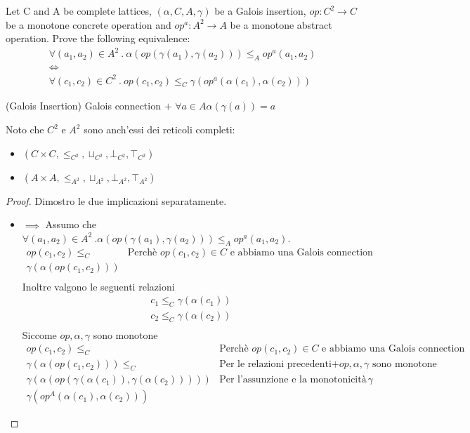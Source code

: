 {Let C and A be complete lattices, $(\alpha, C, A, \gamma)$ be a Galois insertion, $op : C^2 \to C$ be a monotone concrete operation and $op^a : A^2 \to A$ be a monotone abstract operation. Prove the following equivalence:
$$
\begin{array}{c}
	\forall (a_1, a_2) \in A^2\ .\ \alpha(op(\gamma(a_1), \gamma(a_2))) \leq_A op^a(a_1,a_2) \\
	\iff \\
	\forall (c_1, c_2) \in C^2\ .\ op(c_1, c_2) \leq_C \gamma(op^a(\alpha(c_1), \alpha(c_2)))
\end{array}
$$
}
{
\begin{mydef}(Galois Insertion)
Galois connection $+$ $\forall a \in A \alpha(\gamma(a)) = a$
\end{mydef}

Noto che $C^2$ e $A^2$ sono anch'essi dei reticoli completi:
\begin{itemize}
	\item $(C \times C, \leq_{C^2}, \sqcup_{C^2}, \bot_{C^2}, \top_{C^2})$
	\item $(A \times A, \leq_{A^2}, \sqcup_{A^2}, \bot_{A^2}, \top_{A^2})$
\end{itemize}
\begin{proof}
	Dimostro le due implicazioni separatamente.
\begin{itemize}
\item
$\boxed{\implies}$ 
Assumo che $\forall (a_1, a_2) \in A^2\ .  \alpha(op(\gamma(a_1), \gamma(a_2))) \leq_A op^a(a_1,a_2)$.
$$
\begin{array}{lr}
	op(c_1, c_2) \leq_C & \text{Perchè $op(c_1, c_2) \in C$ e abbiamo una Galois connection}\\
	\gamma(\alpha(op(c_1, c_2))) & \\
\end{array}
$$	
Inoltre valgono le seguenti relazioni
$$
\begin{array}{l}
c_1 \leq_C \gamma(\alpha(c_1))\\
c_2 \leq_C \gamma(\alpha(c_2))\\
\end{array}
$$
Siccome $op, \alpha, \gamma$ sono monotone
$$
\begin{array}{lr}
op(c_1, c_2) \leq_C & \text{Perchè $op(c_1, c_2) \in C$ e abbiamo una Galois connection}\\
\gamma(\alpha(op(c_1, c_2))) \leq_C & \text{Per le relazioni precedenti+$op, \alpha, \gamma$ sono monotone}\\
\gamma(\alpha(op(\gamma(\alpha(c_1)), \gamma(\alpha(c_2) )))) & \text{Per l'assunzione e la monotonicità di $\gamma$}\\
\gamma(op^A (\alpha(c_1), \alpha(c_2)))
\end{array}
$$


\end{itemize}
\end{proof}}
